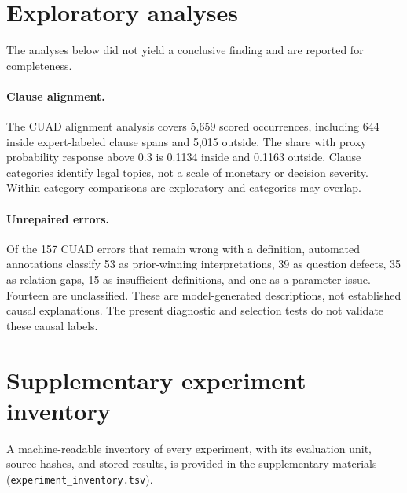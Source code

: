 \section{Exploratory analyses}\label{app:exploratory}
The analyses below did not yield a conclusive finding and are reported for completeness.

\paragraph{Clause alignment.}
The CUAD alignment analysis covers 5,659 scored occurrences, including 644 inside expert-labeled clause spans and 5,015 outside. The share with proxy probability response above 0.3 is 0.1134 inside and 0.1163 outside. Clause categories identify legal topics, not a scale of monetary or decision severity. Within-category comparisons are exploratory and categories may overlap.

\paragraph{Unrepaired errors.}
Of the 157 CUAD errors that remain wrong with a definition, automated annotations classify 53 as prior-winning interpretations, 39 as question defects, 35 as relation gaps, 15 as insufficient definitions, and one as a parameter issue. Fourteen are unclassified. These are model-generated descriptions, not established causal explanations. The present diagnostic and selection tests do not validate these causal labels.

\section{Supplementary experiment inventory}
A machine-readable inventory of every experiment, with its evaluation unit, source hashes, and stored results, is provided in the supplementary materials (\texttt{experiment\_inventory.tsv}).
